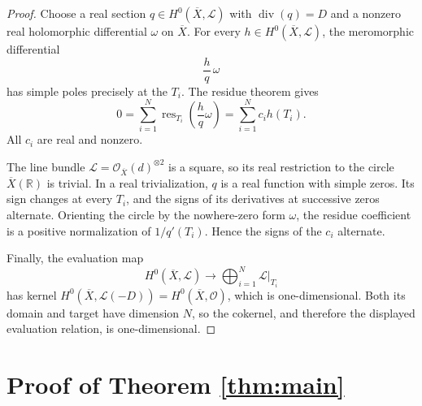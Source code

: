 \documentclass[11pt]{article}
\newcommand{\R}{\mathbb{R}}
\newcommand{\cL}{\mathcal{L}}
\begin{document}
\begin{proof}
Choose a real section $q\in H^0(\overline X,\cL)$ with
$\operatorname{div}(q)=D$ and a nonzero real holomorphic differential
$\omega$ on $\overline X$. For every $h\in H^0(\overline X,\cL)$, the
meromorphic differential
\[
 \frac{h}{q}\,\omega
\]
has simple poles precisely at the $T_i$. The residue theorem gives
\[
 0=\sum_{i=1}^{N}\operatorname{res}_{T_i}
       \left(\frac{h}{q}\omega\right)
   =\sum_{i=1}^{N}c_i h(T_i).
\]
All $c_i$ are real and nonzero.

The line bundle $\cL=\mathcal O_{\overline X}(d)^{\otimes2}$ is a square,
so its real restriction to the circle $\overline X(\R)$ is trivial.
In a real trivialization, $q$ is a real function with simple zeros.
Its sign changes at every $T_i$, and the signs of its derivatives at
successive zeros alternate. Orienting the circle by the nowhere-zero
form $\omega$, the residue coefficient is a positive normalization of
$1/q'(T_i)$. Hence the signs of the $c_i$ alternate.

Finally, the evaluation map
\[
 H^0(\overline X,\cL)\longrightarrow
 \bigoplus_{i=1}^{N}\cL|_{T_i}
\]
has kernel $H^0(\overline X,\cL(-D))=H^0(\overline X,\mathcal O)$,
which is one-dimensional. Both its domain and target have dimension
$N$, so the cokernel, and therefore the displayed evaluation relation,
is one-dimensional.
\end{proof}

\section*{Proof of Theorem \ref{thm:main}}
\end{document}

